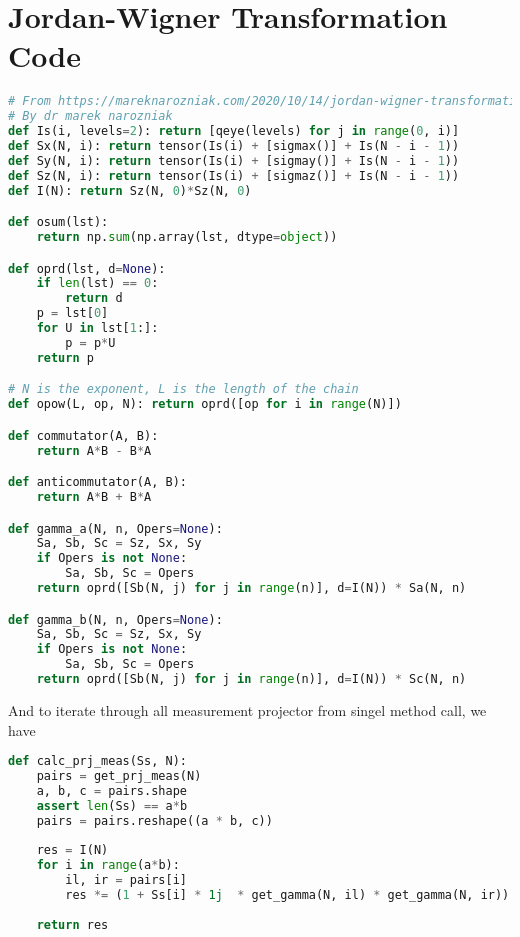 \documentclass{article}
\begin{document}
\section{Jordan-Wigner Transformation Code} %
\label{sec:Jordan-Wigner Transformation Code}
\begin{lstlisting}[language=Python]
# From https://mareknarozniak.com/2020/10/14/jordan-wigner-transformation/
# By dr marek narozniak
def Is(i, levels=2): return [qeye(levels) for j in range(0, i)]
def Sx(N, i): return tensor(Is(i) + [sigmax()] + Is(N - i - 1))
def Sy(N, i): return tensor(Is(i) + [sigmay()] + Is(N - i - 1))
def Sz(N, i): return tensor(Is(i) + [sigmaz()] + Is(N - i - 1))
def I(N): return Sz(N, 0)*Sz(N, 0)

def osum(lst): 
    return np.sum(np.array(lst, dtype=object))

def oprd(lst, d=None):
    if len(lst) == 0:
        return d
    p = lst[0]
    for U in lst[1:]:
        p = p*U
    return p

# N is the exponent, L is the length of the chain
def opow(L, op, N): return oprd([op for i in range(N)])

def commutator(A, B):
    return A*B - B*A

def anticommutator(A, B):
    return A*B + B*A

def gamma_a(N, n, Opers=None):
    Sa, Sb, Sc = Sz, Sx, Sy
    if Opers is not None:
        Sa, Sb, Sc = Opers
    return oprd([Sb(N, j) for j in range(n)], d=I(N)) * Sa(N, n)

def gamma_b(N, n, Opers=None):
    Sa, Sb, Sc = Sz, Sx, Sy
    if Opers is not None:
        Sa, Sb, Sc = Opers
    return oprd([Sb(N, j) for j in range(n)], d=I(N)) * Sc(N, n)
\end{lstlisting}

And to iterate through all measurement projector from singel method call, we have
\begin{lstlisting}[language=Python]
def calc_prj_meas(Ss, N):
    pairs = get_prj_meas(N)
    a, b, c = pairs.shape
    assert len(Ss) == a*b
    pairs = pairs.reshape((a * b, c))
    
    res = I(N)    
    for i in range(a*b):
        il, ir = pairs[i]
        res *= (1 + Ss[i] * 1j  * get_gamma(N, il) * get_gamma(N, ir))
    
    return res
\end{lstlisting}

\end{document}
